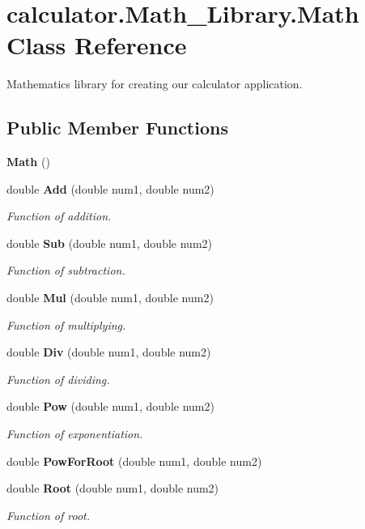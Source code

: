 \section{calculator.\+Math\+\_\+\+Library.\+Math Class Reference}
\label{classcalculator_1_1_math___library_1_1_math}


Mathematics library for creating our calculator application.  


\subsection*{Public Member Functions}
\begin{DoxyCompactItemize}
\item 
\textbf{ Math} ()
\item 
double \textbf{ Add} (double num1, double num2)
\begin{DoxyCompactList}\small\item\em Function of addition. \end{DoxyCompactList}\item 
double \textbf{ Sub} (double num1, double num2)
\begin{DoxyCompactList}\small\item\em Function of subtraction. \end{DoxyCompactList}\item 
double \textbf{ Mul} (double num1, double num2)
\begin{DoxyCompactList}\small\item\em Function of multiplying. \end{DoxyCompactList}\item 
double \textbf{ Div} (double num1, double num2)
\begin{DoxyCompactList}\small\item\em Function of dividing. \end{DoxyCompactList}\item 
double \textbf{ Pow} (double num1, double num2)
\begin{DoxyCompactList}\small\item\em Function of exponentiation. \end{DoxyCompactList}\item 
double \textbf{ Pow\+For\+Root} (double num1, double num2)
\item 
double \textbf{ Root} (double num1, double num2)
\begin{DoxyCompactList}\small\item\em Function of root. \end{DoxyCompactList}\item 

\end{DoxyCompactItemize}
